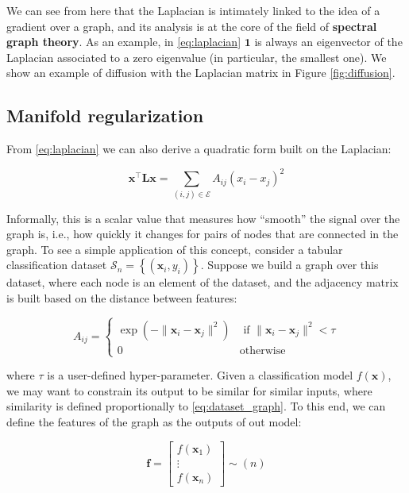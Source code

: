 We can see from here that the Laplacian is intimately linked to the idea of a gradient over a graph, and its analysis is at the core of the field of \textbf{spectral graph theory}. As an example, in \eqref{eq:laplacian} $\mathbf{1}$ is always an eigenvector of the Laplacian associated to a zero eigenvalue (in particular, the smallest one). We show an example of diffusion with the Laplacian matrix in Figure \ref{fig:diffusion}.



\subsection{Manifold regularization}

From \eqref{eq:laplacian} we can also derive a quadratic form built on the Laplacian:

\begin{equation}
\mathbf{x}^\top\mathbf{L}\mathbf{x}=\sum_{(i,j)\in \mathcal{E}}A_{ij}(x_i-x_j)^2
\label{eq:laplacian_regularizer}
\end{equation}

Informally, this is a scalar value that measures how “smooth” the signal over the graph is, i.e., how quickly it changes for pairs of nodes that are connected in the graph. To see a simple application of this concept, consider a tabular classification dataset $\mathcal{S}_n = \left\{(\mathbf{x}_i, y_i)\right\}$. Suppose we build a graph over this dataset, where each node is an element of the dataset, and the adjacency matrix is built based on the distance between features:

\begin{equation}
A_{ij}=\begin{cases} \exp(-\lVert \mathbf{x}_i - \mathbf{x}_j \rVert^2) & \text{ if } \lVert \mathbf{x}_i - \mathbf{x}_j \rVert^2 < \tau \\ 0 & \text{otherwise} \end{cases}
\label{eq:dataset_graph}
\end{equation}

where $\tau$ is a user-defined hyper-parameter. Given a classification model $f(\mathbf{x})$, we may want to constrain its output to be similar for similar inputs, where similarity is defined proportionally to \eqref{eq:dataset_graph}. To this end, we can define the features of the graph as the outputs of out model:

$$
\mathbf{f} = \begin{bmatrix} f(\mathbf{x}_1) \\ \vdots \\ f(\mathbf{x}_n) \end{bmatrix} \sim (n)
$$

